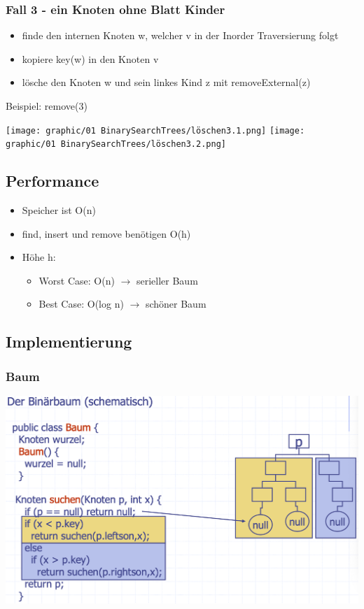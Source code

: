 \subsubsection{Fall 3 - ein Knoten ohne Blatt Kinder}
\begin{itemize}
    \item finde den internen Knoten w, welcher v in der Inorder Traversierung folgt
    \item kopiere key(w) in den Knoten v
    \item lösche den Knoten w und sein linkes Kind z mit removeExternal(z)
\end{itemize}
Beispiel: remove(3)
\vspace{-8pt}
\begin{multicols}{2}
    \texttt{[image: graphic/01 BinarySearchTrees/löschen3.1.png]}
    \texttt{[image: graphic/01 BinarySearchTrees/löschen3.2.png]}
\end{multicols}
\vspace{-8pt}

\subsection{Performance}
\begin{itemize}
    \item Speicher ist O(n)
    \item find, insert und remove benötigen O(h)
    \item Höhe h:
    \begin{itemize}
        \item Worst Case: O(n) $\rightarrow$ serieller Baum
        \item Best Case: O(log n) $\rightarrow$ schöner Baum
    \end{itemize}
\end{itemize}

\subsection{Implementierung}
\subsubsection{Baum}
\begin{center}
    \includegraphics[scale=.22]{graphic/01 BinarySearchTrees/Baum.png}
\end{center}
\vspace{-8pt}

